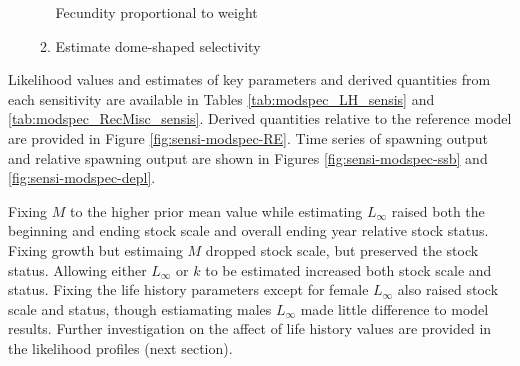 \documentclass[11pt,
  english,
  a4paper,
]{article}
\begin{document}
\begin{itemize}
\begin{enumerate}

    Fecundity proportional to weight

    \tagmcend\tagstructend\tagstructend

    \tagmcend\tagstructend\tagstructend
  \item


    Estimate dome-shaped selectivity

    \tagmcend\tagstructend\tagstructend

    \tagmcend\tagstructend\tagstructend
  \end{enumerate}

  \tagstructend
\end{itemize}

\tagstructend


Likelihood values and estimates of key parameters and derived quantities from each sensitivity are available in Tables \ref{tab:modspec_LH_sensis} and \ref{tab:modspec_RecMisc_sensis}. Derived quantities relative to the reference model are provided in Figure \ref{fig:sensi-modspec-RE}. Time series of spawning output and relative spawning output are shown in Figures \ref{fig:sensi-modspec-ssb} and \ref{fig:sensi-modspec-depl}.

\leavevmode\tagmcend\tagstructend\par


Fixing {\(M\)\leavevmode\tagmcend\tagstructend} to the higher prior mean value while estimating {\(L_{\infty}\)\leavevmode\tagmcend\tagstructend} raised both the beginning and ending stock scale and overall ending year relative stock status. Fixing growth but estimaing {\(M\)\leavevmode\tagmcend\tagstructend} dropped stock scale, but preserved the stock status. Allowing either {\(L_{\infty}\)\leavevmode\tagmcend\tagstructend} or {\(k\)\leavevmode\tagmcend\tagstructend} to be estimated increased both stock scale and status. Fixing the life history parameters except for female {\(L_{\infty}\)\leavevmode\tagmcend\tagstructend} also raised stock scale and status, though estiamating males {\(L_{\infty}\)\leavevmode\tagmcend\tagstructend} made little difference to model results. Further investigation on the affect of life history values are provided in the likelihood profiles (next section).
\end{document}
